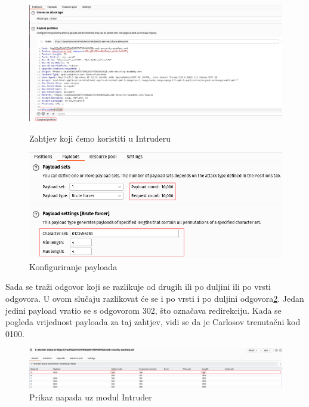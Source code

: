 \begin{figure}[H]
  \centering
  \begin{minipage}[b]{0.45\textwidth}
    \centering
    \includegraphics[width=\textwidth]{slike/intruder_2fa.png}
    \caption{Zahtjev koji ćemo koristiti u Intruderu}
    \label{slk:burp_req}
  \end{minipage}
  \hspace{0.05\textwidth} %
  \begin{minipage}[b]{0.45\textwidth}
    \centering
    \includegraphics[width=\textwidth]{slike/payload_intruder.png}
    \caption{Konfiguriranje payloada}
  \end{minipage}
  \label{slk:burp_req_config}
\end{figure}

Sada se traži odgovor koji se razlikuje od drugih ili po duljini ili po vrsti odgovora. U ovom slučaju razlikovat će se i po vrsti i po duljini odgovora\ref{slk:burp_atks}. Jedan jedini payload vratio se s odgovorom 302, što označava redirekciju. Kada se pogleda vrijednost payloada za taj zahtjev, vidi se da je Carlosov trenutačni kod 0100.
\begin{figure}[H]
  \centering
  \includegraphics[width=1\textwidth]{slike/intruder_atk.png}
  \caption{Prikaz napada uz modul Intruder}
  \label{slk:burp_atks}
\end{figure}

